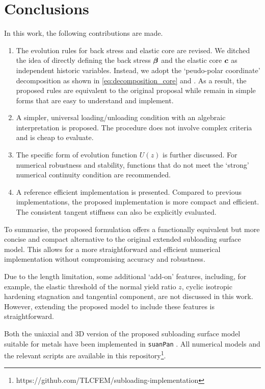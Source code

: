 \section{Conclusions}
In this work, the following contributions are made.
\begin{enumerate}
    \item The evolution rules for back stress and elastic core are revised.
    We ditched the idea of directly defining the back stress $\bm{\beta}$ and the elastic core $\bm{c}$ as independent historic variables.
    Instead, we adopt the `peudo-polar coordinate' decomposition as shown in \eqref{eq:decomposition_core} and .
    As a result, the proposed rules are equivalent to the original proposal while remain in simple forms that are easy to understand and implement.
    \item A simpler, universal loading/unloading condition with an algebraic interpretation is proposed.
    The procedure does not involve complex criteria and is cheap to evaluate.
    \item The specific form of evolution function $U\left(z\right)$ is further discussed.
          For numerical robustness and stability, functions that do not meet the `strong' numerical continuity condition are recommended.
    \item A reference efficient implementation is presented.
    Compared to previous implementations, the proposed implementation is more compact and efficient.
    The consistent tangent stiffness can also be explicitly evaluated.
\end{enumerate}
To summarise, the proposed formulation offers a functionally equivalent but more concise and compact alternative to the original extended subloading surface model.
This allows for a more straightforward and efficient numerical implementation without compromising accuracy and robustness.

Due to the length limitation, some additional `add-on' features, including, for example, the elastic threshold of the normal yield ratio $z$, cyclic isotropic hardening stagnation and tangential component, are not discussed in this work.
However, extending the proposed model to include these features is straightforward.

Both the uniaxial and 3D version of the proposed subloading surface model suitable for metals have been implemented in \texttt{suanPan} \citep{Chang2024}.
All numerical models and the relevant scripts are available in this repository\footnote{https://github.com/TLCFEM/subloading-implementation}.